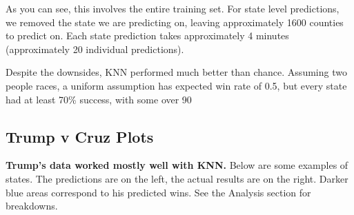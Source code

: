 \documentclass[11pt]{article}
\begin{document}
As you can see, this involves the entire training set. For state level predictions, we removed the state we are predicting on, leaving approximately 1600 counties to predict on. Each state prediction takes approximately 4 minutes (approximately 20 individual predictions). 

Despite the downsides, KNN performed much better than chance. Assuming two people races, a uniform assumption has expected win rate of 0.5, but every state had at least 70\% success, with some over 90%

\subsection{Trump v Cruz Plots}
\textbf{Trump's data worked mostly well with KNN.} Below are some examples of states. The predictions are on the left, the actual results are on the right. Darker blue areas correspond to his predicted wins. See the Analysis section for breakdowns.  \\
\end{document}
